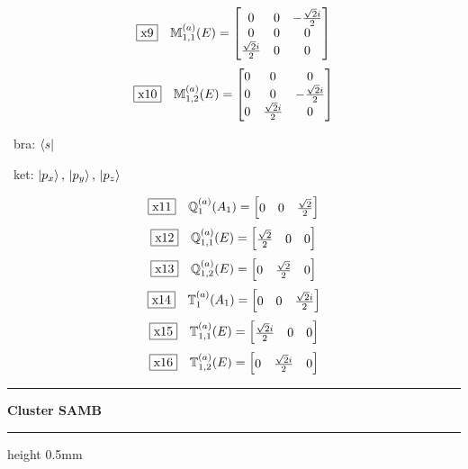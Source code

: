 \documentclass[fleqn,10pt,landscape]{jsarticle}
\begin{document}
\begin{dmath*}
\fbox{x9}\quad \mathbb{M}_{1,1}^{(a)}(E)=\begin{bmatrix} 0 & 0 & - \frac{\sqrt{2} i}{2} \\ 0 & 0 & 0 \\ \frac{\sqrt{2} i}{2} & 0 & 0 \end{bmatrix}
\end{dmath*}
\begin{dmath*}
\fbox{x10}\quad \mathbb{M}_{1,2}^{(a)}(E)=\begin{bmatrix} 0 & 0 & 0 \\ 0 & 0 & - \frac{\sqrt{2} i}{2} \\ 0 & \frac{\sqrt{2} i}{2} & 0 \end{bmatrix}
\end{dmath*}
\vspace{5mm}

\noindent\textbullet\, bra: $\bra{s}$

\noindent\textbullet\, ket: $\ket{p_{x}},\, \ket{p_{y}},\, \ket{p_{z}}$

\begin{dmath*}
\fbox{x11}\quad \mathbb{Q}_{1}^{(a)}(A_{1})=\begin{bmatrix} 0 & 0 & \frac{\sqrt{2}}{2} \end{bmatrix}
\end{dmath*}
\begin{dmath*}
\fbox{x12}\quad \mathbb{Q}_{1,1}^{(a)}(E)=\begin{bmatrix} \frac{\sqrt{2}}{2} & 0 & 0 \end{bmatrix}
\end{dmath*}
\begin{dmath*}
\fbox{x13}\quad \mathbb{Q}_{1,2}^{(a)}(E)=\begin{bmatrix} 0 & \frac{\sqrt{2}}{2} & 0 \end{bmatrix}
\end{dmath*}
\begin{dmath*}
\fbox{x14}\quad \mathbb{T}_{1}^{(a)}(A_{1})=\begin{bmatrix} 0 & 0 & \frac{\sqrt{2} i}{2} \end{bmatrix}
\end{dmath*}
\begin{dmath*}
\fbox{x15}\quad \mathbb{T}_{1,1}^{(a)}(E)=\begin{bmatrix} \frac{\sqrt{2} i}{2} & 0 & 0 \end{bmatrix}
\end{dmath*}
\begin{dmath*}
\fbox{x16}\quad \mathbb{T}_{1,2}^{(a)}(E)=\begin{bmatrix} 0 & \frac{\sqrt{2} i}{2} & 0 \end{bmatrix}
\end{dmath*}
\vspace{5mm}
\noindent \rule[0.5mm]{5mm}{0.5mm}\hspace{3mm}\textbf{Cluster SAMB}\hspace{3mm}\leaders\hrule height 0.5mm\hfill\kern0pt
\vspace{3mm}
\end{document}
